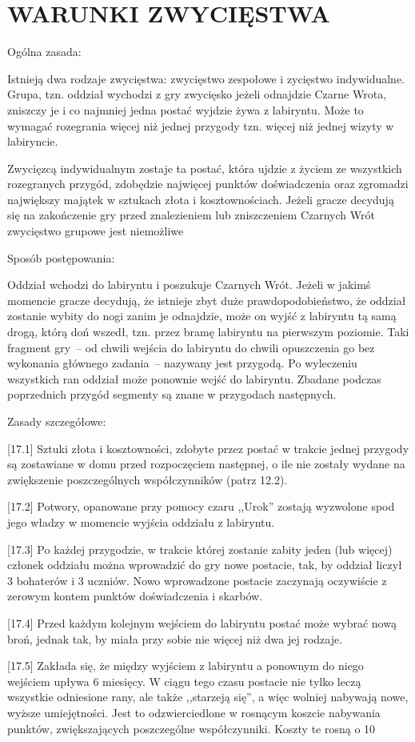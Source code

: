 \section{WARUNKI ZWYCIĘSTWA}

Ogólna zasada:

Istnieją dwa rodzaje zwycięstwa: zwycięstwo zespołowe i zycięstwo indywidualne.
Grupa, tzn. oddział wychodzi z gry zwycięsko jeżeli odnajdzie Czarne Wrota, zniszczy je i co najmniej jedna postać wyjdzie żywa z labiryntu.
Może to wymagać rozegrania więcej niż jednej przygody tzn. więcej niż jednej wizyty w labiryncie.

Zwycięzcą indywidualnym zostaje ta postać, która ujdzie z życiem ze wszystkich rozegranych przygód, zdobędzie najwięcej punktów doświadczenia oraz zgromadzi największy majątek w sztukach złota i kosztownościach.
Jeżeli gracze decydują się na zakończenie gry przed znalezieniem lub zniszczeniem Czarnych Wrót zwycięstwo grupowe jest niemożliwe

Sposób postępowania:

Oddział wchodzi do labiryntu i poszukuje Czarnych Wrót.
Jeżeli w jakimś momencie gracze decydują, że istnieje zbyt duże prawdopodobieństwo, że oddział zostanie wybity do nogi zanim je odnajdzie, może on wyjść z labiryntu tą samą drogą, którą doń wszedł, tzn. przez bramę labiryntu na pierwszym poziomie.
Taki fragment gry~-- od chwili wejścia do labiryntu do chwili opuszczenia go bez wykonania głównego zadania~-- nazywany jest przygodą.
Po wyleczeniu wszystkich ran oddział może ponownie wejść do labiryntu.
Zbadane podczas poprzednich przygód segmenty są znane w przygodach następnych.

Zasady szczegółowe:

[17.1] Sztuki złota i kosztowności, zdobyte przez postać w trakcie jednej przygody są zostawiane w domu przed rozpoczęciem następnej, o ile nie zostały wydane na zwiększenie poszczególnych współczynników (patrz 12.2).

[17.2] Potwory, opanowane przy pomocy czaru ,,Urok'' zostają wyzwolone spod jego władzy w momencie wyjścia oddziału z labiryntu.

[17.3] Po każdej przygodzie, w trakcie której zostanie zabity jeden (lub więcej) członek oddziału można wprowadzić do gry nowe postacie, tak, by oddział liczył 3 bohaterów i 3 uczniów.
Nowo wprowadzone postacie zaczynają oczywiście z zerowym kontem punktów doświadczenia i skarbów.

[17.4] Przed każdym kolejnym wejściem do labiryntu postać może wybrać nową broń, jednak tak, by miała przy sobie nie więcej niż dwa jej rodzaje.

[17.5] Zakłada się, że między wyjściem z labiryntu a ponownym do niego wejściem upływa 6 miesięcy.
W ciągu tego czasu postacie nie tylko leczą wszystkie odniesione rany, ale także ,,starzeją się'', a więc wolniej nabywają nowe, wyższe umiejętności.
Jest to odzwierciedlone w rosnącym koszcie nabywania punktów, zwiększających poszczególne współczynniki.
Koszty te rosną o 10%
